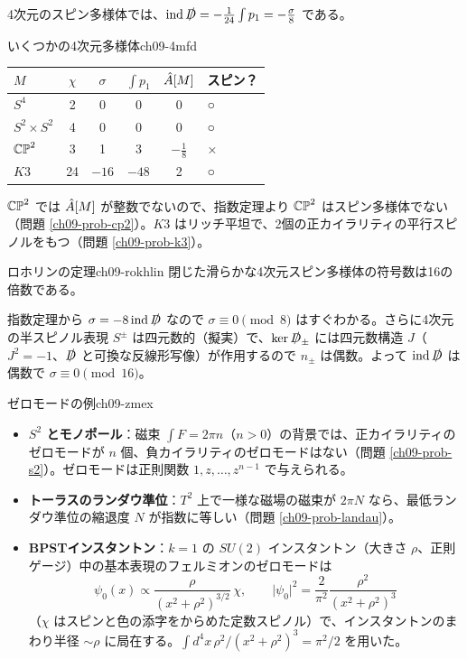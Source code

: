 4次元のスピン多様体では、$\operatorname{ind}\slashed D=-\frac1{24}\int p_1=-\frac{\sigma}{8}$ である。

\begin{myex}{いくつかの4次元多様体}{ch09-4mfd}
\begin{center}
\renewcommand{\arraystretch}{1.2}\small
\begin{tabular}{lccccl}
$M$ & $\chi$ & $\sigma$ & $\int p_1$ & $\hat{A}[M]$ & スピン？\\ \hline
$S^4$ & 2 & 0 & 0 & 0 & ○\\
$S^2\times S^2$ & 4 & 0 & 0 & 0 & ○\\
$\mathbb{CP}^2$ & 3 & 1 & 3 & $-\tfrac18$ & ×\\
$K3$ & 24 & $-16$ & $-48$ & 2 & ○
\end{tabular}
\end{center}
$\mathbb{CP}^2$ では $\hat{A}[M]$ が整数でないので、指数定理より $\mathbb{CP}^2$ はスピン多様体でない（問題 \ref{ch09-prob-cp2}）。$K3$ はリッチ平坦で、2個の正カイラリティの平行スピノルをもつ（問題 \ref{ch09-prob-k3}）。
\end{myex}

\begin{mythm}{ロホリンの定理}{ch09-rokhlin}
閉じた滑らかな4次元スピン多様体の符号数は16の倍数である。
\end{mythm}
\begin{note}
指数定理から $\sigma=-8\operatorname{ind}\slashed D$ なので $\sigma\equiv0\pmod 8$ はすぐわかる。さらに4次元の半スピノル表現 $S^\pm$ は四元数的（擬実）で、$\ker\slashed D_\pm$ には四元数構造 $J$（$J^2=-1$、$\slashed D$ と可換な反線形写像）が作用するので $n_\pm$ は偶数。よって $\operatorname{ind}\slashed D$ は偶数で $\sigma\equiv0\pmod{16}$。
\end{note}

\begin{myex}{ゼロモードの例}{ch09-zmex}
\begin{itemize}
\item \textbf{$S^2$ とモノポール}：磁束 $\int F=2\pi n$（$n>0$）の背景では、正カイラリティのゼロモードが $n$ 個、負カイラリティのゼロモードはない（問題 \ref{ch09-prob-s2}）。ゼロモードは正則関数 $1,z,\dots,z^{n-1}$ で与えられる。
\item \textbf{トーラスのランダウ準位}：$T^2$ 上で一様な磁場の磁束が $2\pi N$ なら、最低ランダウ準位の縮退度 $N$ が指数に等しい（問題 \ref{ch09-prob-landau}）。
\item \textbf{BPSTインスタントン}：$k=1$ の $SU(2)$ インスタントン（大きさ $\rho$、正則ゲージ）中の基本表現のフェルミオンのゼロモードは
\[
\psi_0(x)\propto\frac{\rho}{(x^2+\rho^2)^{3/2}}\,\chi,\qquad \lvert\psi_0\rvert^2=\frac{2}{\pi^2}\frac{\rho^2}{(x^2+\rho^2)^3}
\]
（$\chi$ はスピンと色の添字をからめた定数スピノル）で、インスタントンのまわり半径 $\sim\rho$ に局在する。$\int d^4x\,\rho^2/(x^2+\rho^2)^3=\pi^2/2$ を用いた。
\end{itemize}
\end{myex}

